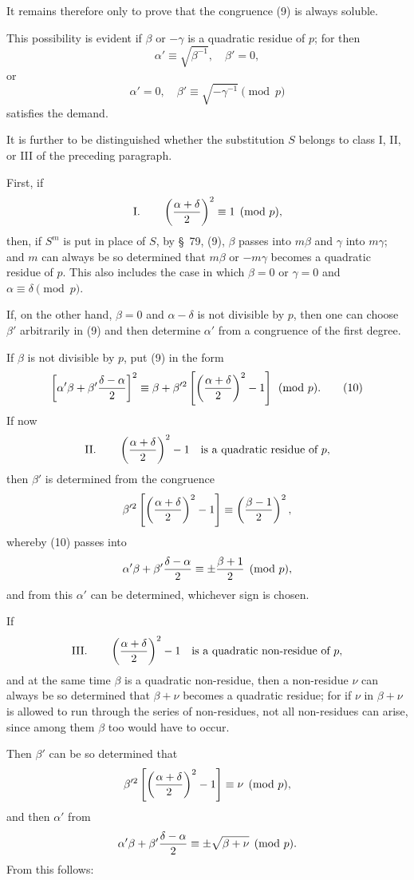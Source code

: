 \documentclass[11pt]{article}
\begin{document}
It remains therefore only to prove that the congruence (9) is always soluble.

This possibility is evident if $\beta$ or $-\gamma$ is a quadratic residue of $p$; for then
\[
 \alpha'\equiv\sqrt{\beta^{-1}},\quad \beta'=0,
\]
or
\[
 \alpha'=0,
 \quad \beta'\equiv\sqrt{-\gamma^{-1}}\pmod p
\]
satisfies the demand.

It is further to be distinguished whether the substitution $S$ belongs to class I, II, or III of the preceding paragraph.

First, if
\[
\text{I.}\qquad
 \left({\alpha+
\delta\over2}\right)^2\equiv1\pmod p,
\]
then, if $S^m$ is put in place of $S$, by \S~79, (9), $\beta$ passes into $m\beta$ and $\gamma$ into $m\gamma$; and $m$ can always be so determined that $m\beta$ or $-m\gamma$ becomes a quadratic residue of $p$. This also includes the case in which $\beta=0$ or $\gamma=0$ and $\alpha\equiv\delta\pmod p$.

If, on the other hand, $\beta=0$ and $\alpha-\delta$ is not divisible by $p$, then one can choose $\beta'$ arbitrarily in (9) and then determine $\alpha'$ from a congruence of the first degree.

If $\beta$ is not divisible by $p$, put (9) in the form
\begin{equation}
 \left[\alpha'\beta+\beta'{\delta-\alpha\over2}\right]^2
 \equiv
 \beta+\beta'^2\left[\left({\alpha+
\delta\over2}\right)^2-1\right]
 \pmod p.
\tag{10}
\end{equation}
If now
\[
\text{II.}\qquad
 \left({\alpha+
\delta\over2}\right)^2-1
\quad\text{is a quadratic residue of }p,
\]
then $\beta'$ is determined from the congruence
\[
 \beta'^2\left[\left({\alpha+
\delta\over2}\right)^2-1\right]
 \equiv \left({\beta-1\over2}\right)^2,
\]
whereby (10) passes into
\[
 \alpha'\beta+
\beta'{\delta-\alpha\over2}\equiv
 \pm {\beta+1\over2}\pmod p,
\]
and from this $\alpha'$ can be determined, whichever sign is chosen.

If
\[
\text{III.}\qquad
 \left({\alpha+
\delta\over2}\right)^2-1
\quad\text{is a quadratic non-residue of }p,
\]
and at the same time $\beta$ is a quadratic non-residue, then a non-residue $\nu$ can always be so determined that $\beta+\nu$ becomes a quadratic residue; for if $\nu$ in $\beta+\nu$ is allowed to run through the series of non-residues, not all non-residues can arise, since among them $\beta$ too would have to occur.

Then $\beta'$ can be so determined that
\[
 \beta'^2\left[\left({\alpha+
\delta\over2}\right)^2-1\right]
 \equiv \nu\pmod p,
\]
and then $\alpha'$ from
\[
 \alpha'\beta+
\beta'{\delta-\alpha\over2}\equiv
 \pm\sqrt{\beta+
\nu}\pmod p.
\]
From this follows:
\end{document}
